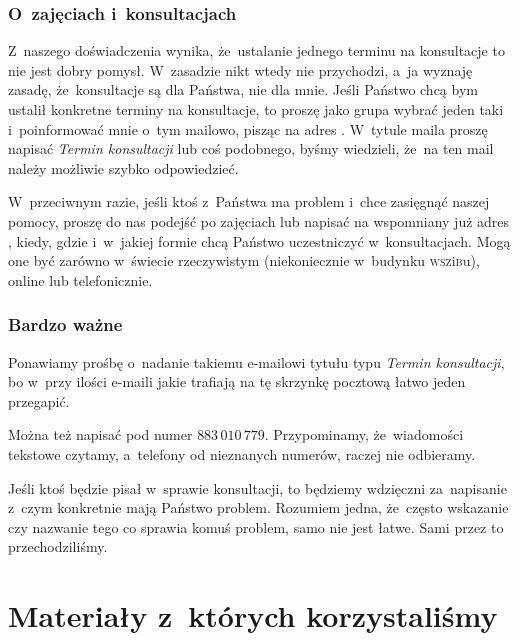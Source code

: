\documentclass[10pt,t]{beamer}
\begin{document}
\begin{frame}
  \frametitle{O~zajęciach i~konsultacjach}


  Z~naszego doświadczenia wynika, że~ustalanie jednego terminu na
  konsultacje to nie jest dobry pomysł. W~zasadzie nikt wtedy nie
  przychodzi, a~ja wyznaję zasadę, że~konsultacje są dla Państwa, nie dla
  mnie. Jeśli Państwo chcą bym ustalił konkretne terminy na konsultacje, to
  proszę jako grupa wybrać jeden taki i~poinformować mnie o~tym mailowo,
  pisząc na adres \email. W~tytule maila proszę napisać \textit{Termin
    konsultacji} lub coś podobnego, byśmy wiedzieli, że~na ten mail należy
  możliwie szybko odpowiedzieć.

  W~przeciwnym razie, jeśli ktoś z~Państwa ma problem i~chce zasięgnąć
  naszej pomocy, proszę do nas podejść po zajęciach lub napisać na
  wspomniany już adres \email, kiedy, gdzie i~w~jakiej formie chcą Państwo
  uczestniczyć w~konsultacjach. Mogą one być zarówno w~świecie rzeczywistym
  (niekoniecznie w~budynku \textsc{wsz}i\textsc{b}u), online lub
  telefonicznie.

\end{frame}





\begin{frame}
  \frametitle{Bardzo ważne}


  Ponawiamy prośbę o~nadanie takiemu e-mailowi tytułu typu \textit{Termin
    konsultacji}, bo w~przy ilości e-maili jakie trafiają na tę skrzynkę
  pocztową łatwo jeden przegapić.

  Można też napisać pod numer $883 \, 010 \, 779$. Przypominamy,
  że~wiadomości tekstowe czytamy, a~telefony od nieznanych numerów, raczej
  nie odbieramy.

  Jeśli ktoś będzie pisał w~sprawie konsultacji, to będziemy wdzięczni
  za~napisanie z~czym konkretnie mają Państwo problem. Rozumiem jedna,
  że~często wskazanie czy nazwanie tego co sprawia komuś problem, samo nie
  jest łatwe. Sami przez to przechodziliśmy.

\end{frame}










\section{Materiały z~których korzystaliśmy}
\end{document}

